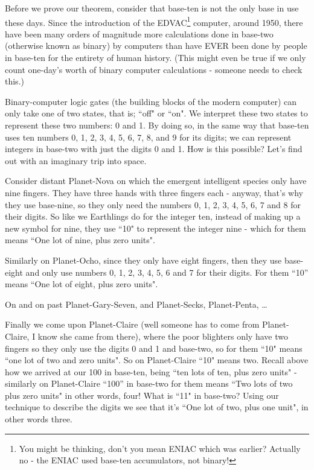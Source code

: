 \documentclass{article}
\begin{document}
Before we prove our theorem,
consider that base-ten is not the only base in use these days.
Since the introduction of the EDVAC\footnote{You might be thinking, don't you
mean ENIAC which was earlier? Actually no - the ENIAC
used base-ten accumulators, not binary!} computer, around 1950,
there have been many orders of magnitude more calculations done
in base-two (otherwise known as binary) by computers than have EVER
been done by people in base-ten for the entirety of human history.
(This might even be true if we only count one-day's worth of
binary computer calculations - someone needs to check this.)

Binary-computer logic gates (the building blocks of the modern computer)
can only take one of two states, that is; ``off" or ``on".
We interpret these two states to represent these two numbers: 0 and 1.
By doing so, in the same way that base-ten uses ten numbers 0,
1, 2, 3, 4, 5, 6, 7, 8, and 9 for its digits; we can represent integers
in base-two with just the digits 0 and 1. How is this possible?
Let's find out with an imaginary trip into space.

Consider distant Planet-Nova on which the emergent
intelligent species only have nine fingers.
They have three hands with three fingers each - anyway,
that's why they use base-nine, so they only need the numbers 0,
1, 2, 3, 4, 5, 6, 7 and 8 for their digits.
So like we Earthlings do for the integer ten,
instead of making up a new symbol for nine,
they use ``10" to represent the integer nine - which
for them means ``One lot of nine, plus zero units".

Similarly on Planet-Ocho, since they only have eight fingers,
then they use base-eight and only use numbers 0, 1,
2, 3, 4, 5, 6 and 7 for their digits. For them ``10''
means ``One lot of eight, plus zero units".

On and on past Planet-Gary-Seven, and Planet-Secks, Planet-Penta, \dots{}

Finally we come upon Planet-Claire (well someone
has to come from Planet-Claire,
I know she came from there),
where the poor blighters only have two fingers
so they only use the digits 0 and 1 and base-two,
so for them ``10" means ``one lot of two and zero units".
So on Planet-Claire ``10" means two.
Recall above how we arrived at our 100 in base-ten,
being ``ten lots of ten,
plus zero units" - similarly on Planet-Claire ``100''
in base-two for them means ``Two lots of two plus zero units" in other words,
four! What is ``11" in base-two? Using our technique to
describe the digits we see that it's ``One lot of two, plus one unit",
in other words three.
\end{document}
